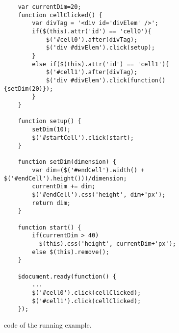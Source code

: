 \begin{figure}
\begin{lstlisting}
	var currentDim=20;
	function cellClicked() {	
		var divTag = '<div id='divElem' />';
		if($(this).attr('id') == 'cell0'){
			$('#cell0').after(divTag);
			$('div #divElem').click(setup);
		}
		else if($(this).attr('id') == 'cell1'){
			$('#cell1').after(divTag);
			$('div #divElem').click(function(){setDim(20)});
		}
	}
			 			
	function setup() {
		setDim(10);
		$('#startCell').click(start);
	}
	
	function setDim(dimension) {
		var dim=($('#endCell').width() + $('#endCell').height()))/dimension;
		currentDim += dim;
		$('#endCell').css('height', dim+'px');
		return dim;
	}
	
	function start() {
		if(currentDim > 40)
		  $(this).css('height', currentDim+'px');
		else $(this).remove(); 
	}
	
	$document.ready(function() {
		...
		$('#cell0').click(cellClicked);	
		$('#cell1').click(cellClicked);	
	});
\end{lstlisting}
\vspace{-0.1in} 

\caption{\javascript code of the running example.}
\label{Fig:funcCovgExample}
\vspace{-0.2in} 

\end{figure}
